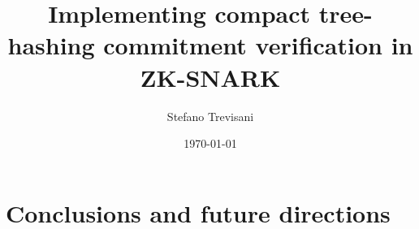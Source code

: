 \documentclass{article}
\author{Stefano Trevisani}
\date{\today}
\title{Implementing compact tree-hashing commitment verification in ZK-SNARK}
\theoremstyle{definition}
\theoremstyle{theorem}
\theoremstyle{example}
\begin{document}
\maketitle
\clearpage
\tableofcontents





\section{Conclusions and future directions}\label{sec:conclusions}
\end{document}
